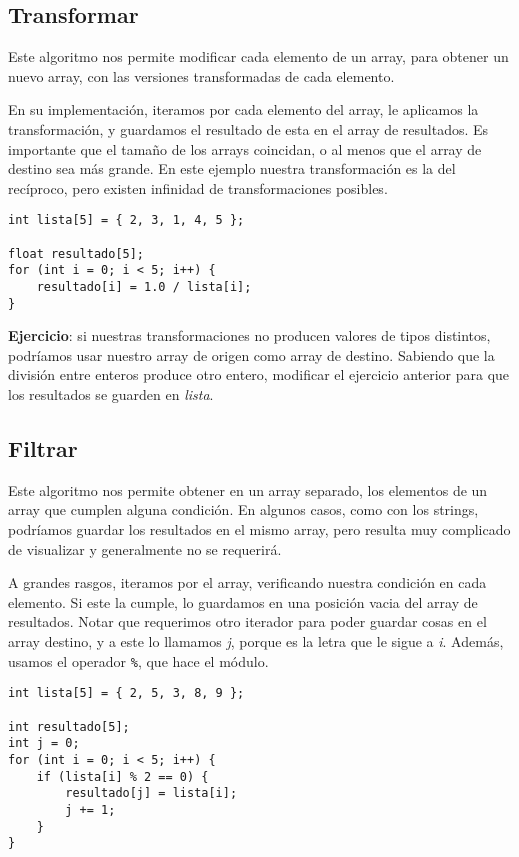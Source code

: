\documentclass[10pt]{article}
\begin{document}
\subsection{Transformar}

Este algoritmo nos permite modificar cada elemento de un array, para obtener un nuevo array, con las versiones transformadas de cada elemento.

\bigskip

En su implementación, iteramos por cada elemento del array, le aplicamos la transformación, y guardamos el resultado de esta en el array de resultados. Es importante que el tamaño de los arrays coincidan, o al menos que el array de destino sea más grande. En este ejemplo nuestra transformación es la del recíproco, pero existen infinidad de transformaciones posibles.

\begin{lstlisting}
int lista[5] = { 2, 3, 1, 4, 5 };

float resultado[5];
for (int i = 0; i < 5; i++) {
	resultado[i] = 1.0 / lista[i];
}
\end{lstlisting}

\textbf{Ejercicio}: si nuestras transformaciones no producen valores de tipos distintos, podríamos usar nuestro array de origen como array de destino. Sabiendo que la división entre enteros produce otro entero, modificar el ejercicio anterior para que los resultados se guarden en \textit{lista}.

\subsection{Filtrar}

Este algoritmo nos permite obtener en un array separado, los elementos de un array que cumplen alguna condición. En algunos casos, como con los strings, podríamos guardar los resultados en el mismo array, pero resulta muy complicado de visualizar y generalmente no se requerirá.

\bigskip

A grandes rasgos, iteramos por el array, verificando nuestra condición en cada elemento. Si este la cumple, lo guardamos en una posición vacia del array de resultados. Notar que requerimos otro iterador para poder guardar cosas en el array destino, y a este lo llamamos \textit{j}, porque es la letra que le sigue a \textit{i}. Además, usamos el operador \lstinline{%}, que hace el módulo.

\begin{lstlisting}
int lista[5] = { 2, 5, 3, 8, 9 };

int resultado[5];
int j = 0;
for (int i = 0; i < 5; i++) {
	if (lista[i] % 2 == 0) {
		resultado[j] = lista[i];
		j += 1;
	}
}
\end{lstlisting}
\end{document}
